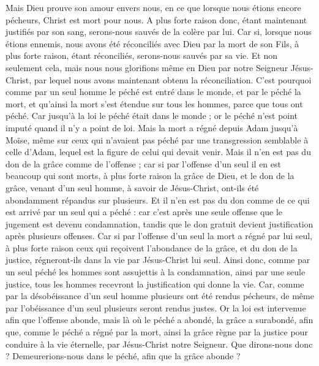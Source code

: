 \begin{multicols}{2}
Mais Dieu prouve son amour envers nous, en ce que lorsque nous étions encore pécheurs, Christ est mort pour nous.
A plus forte raison donc, étant maintenant justifiés par son sang, serons-nous sauvés de la colère par lui.
Car si, lorsque nous étions ennemis, nous avons été réconciliés avec Dieu par la mort de son Fils, à plus forte raison, étant réconciliés, serons-nous sauvés par sa vie.
Et non seulement cela, mais nous nous glorifions même en Dieu par notre Seigneur Jésus-Christ, par lequel nous avons maintenant obtenu la réconciliation.
C'est pourquoi comme par un seul homme le péché est entré dans le monde, et par le péché la mort, et qu'ainsi la mort s'est étendue sur tous les hommes, parce que tous ont péché.
Car jusqu'à la loi le péché était dans le monde ; or le péché n'est point imputé quand il n'y a point de loi.
Mais la mort a régné depuis Adam jusqu'à Moïse, même sur ceux qui n'avaient pas péché par une transgression semblable à celle d'Adam, lequel est la figure de celui qui devait venir.
Mais il n'en est pas du don de la grâce comme de l'offense ; car si par l'offense d'un seul il en est beaucoup qui sont morts, à plus forte raison la grâce de Dieu, et le don de la grâce, venant d'un seul homme, à savoir de Jésus-Christ, ont-ils été abondamment répandus sur plusieurs.
Et il n'en est pas du don comme de ce qui est arrivé par un seul qui a péché : car c'est après une seule offense que le jugement est devenu condamnation, tandis que le don gratuit devient justification après plusieurs offenses.
Car si par l'offense d'un seul la mort a régné par lui seul, à plus forte raison ceux qui reçoivent l'abondance de la grâce, et du don de la justice, régneront-ils dans la vie par Jésus-Christ lui seul.
Ainsi donc, comme par un seul péché les hommes sont assujettis à la condamnation, ainsi par une seule justice, tous les hommes recevront la justification qui donne la vie.
Car, comme par la désobéissance d'un seul homme plusieurs ont été rendus pécheurs, de même par l'obéissance d'un seul plusieurs seront rendus justes.
Or la loi est intervenue afin que l'offense abonde, mais là où le péché a abondé, la grâce a surabondé,
afin que, comme le péché a régné par la mort, ainsi la grâce règne par la justice pour conduire à la vie éternelle, par Jésus-Christ notre Seigneur.
\VerseOne{}Que dirons-nous donc ? Demeurerions-nous dans le péché, afin que la grâce abonde ?

\end{multicols}
